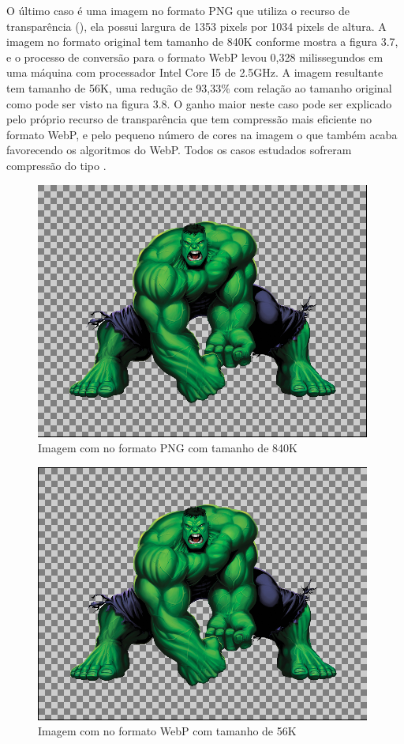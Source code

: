 \documentclass[espaco=simples,appendix=Name]{abnt}
\begin{document}
O último caso é uma imagem no formato PNG que utiliza o recurso de transparência (), ela possui largura de 1353 pixels por 1034 pixels de altura. A imagem no formato original tem tamanho de 840K conforme mostra a figura 3.7, e o processo de conversão para o formato WebP levou 0,328 milissegundos em uma máquina com processador Intel Core I5 de 2.5GHz. A imagem resultante tem tamanho de 56K, uma redução de 93,33\% com relação ao tamanho original como pode ser visto na figura 3.8. O ganho maior neste caso pode ser explicado pelo próprio recurso de transparência que tem compressão mais eficiente no formato WebP, e pelo pequeno número de cores na imagem o que também acaba favorecendo os algoritmos do WebP. Todos os casos estudados sofreram compressão do tipo .

\begin{figure}[h]
  \centering
    \includegraphics[scale=0.5]{Imagem3AlphaPNG.png}
  \caption{Imagem com  no formato PNG com tamanho de 840K}
\end{figure}

\begin{figure}[h]
  \centering
    \includegraphics[scale=0.5]{Imagem3AlphaWEBP.png}
  \caption{Imagem com  no formato WebP com tamanho de 56K}
\end{figure}
\end{document}
